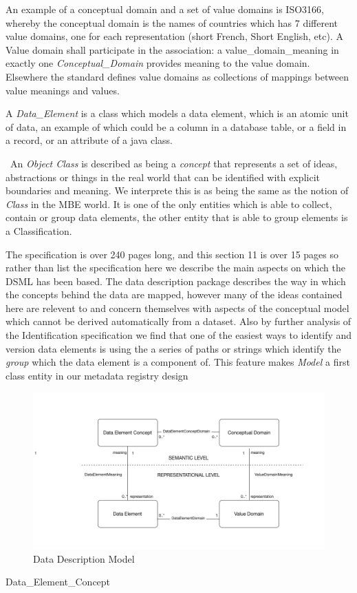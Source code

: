 \documentclass{llncs}
\begin{document}
An example of a conceptual domain and a set of value domains is ISO3166, whereby the conceptual domain is the names of countries which has 7 different value domains, one for each representation (short French, Short English, etc).  A Value domain shall participate in the association: a value\_domain\_meaning in exactly one \emph{Conceptual\_Domain} provides meaning to the value domain. Elsewhere the standard defines value domains as collections of mappings between value meanings and values.

A \emph{Data\_Element} is a class which models a data element, which is an atomic unit of data, an example of which could be a column in a database table, or a field in a record, or an attribute of a java class.




\
An \emph{Object Class} is described as being a \emph{concept} that represents a set of ideas, abstractions or things in the real world that can be identified with explicit boundaries and meaning. We interprete this is as being the same as the notion of \emph{Class} in the MBE world. It is one of the only entities which is able to collect, contain or group data elements, the other entity that is able to group elements is a Classification.

The specification is over 240 pages long, and this section 11 is over 15 pages so rather than list the specification here we describe the main aspects on which the DSML has been based. The data description package describes the way in which the concepts behind the data are mapped, however many of the ideas contained here are relevent to and concern themselves with aspects of the conceptual model which cannot be derived automatically from a dataset.   Also by further analysis of the Identification specification we find that one of the easiest ways to identify and version data elements is using the a series of paths or strings which identify the \emph{group} which the data element is a component of. This feature makes \emph{Model} a first class entity in our metadata registry design



\begin{figure}[h]
\includegraphics[width=1.0\textwidth,natwidth=610,natheight=642]{DataDescModel}
\caption{Data Description Model} 
\label{fig:ddmodel}
\end{figure}

\begin{class}{Data\_Element\_Concept}


 \end{class}
 


\newpage





\end{document}
